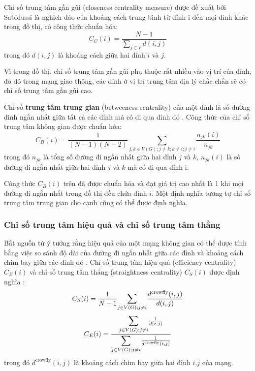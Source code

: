 \documentclass[14pt, oneside, a4paper, openany]{scrartcl}
\begin{document}
Chỉ số trung tâm gần gũi (closeness centrality measure) được đề xuất bởi Sabidussi \cite{centrali03} là nghịch đảo của khoảng cách trung bình từ đỉnh i đến mọi đỉnh khác trong đồ thị, có công thức chuẩn hóa:
\begin{equation}
C_C(i) = \frac{N-1}{\sum_{j \in V} d(i,j)}
\end{equation}
trong đó $d(i,j)$ là khoảng cách giữa hai đỉnh $i$ và $j$.

Vì trong đồ thị, chỉ số trung tâm gần gũi phụ thuộc rất nhiều vào vị trí của đỉnh, đo đó trong mạng giao thông, các đỉnh ở vị trí trung tâm địa lý chắc chắn sẽ có chỉ số trung tâm gần gũi cao.

Chỉ số \textbf{trung tâm trung gian}  (betweeness centrality) của một đỉnh là số đường đinh ngắn nhất giữa tất cả các đỉnh mà có đi qua đỉnh đó \cite{centrali02}. Công thức của chỉ số trung tâm không gian được chuẩn hóa:
\begin{equation}
	C_B(i) = \frac{1}{(N-1)(N-2)} \sum_{j,k \in V(G); j \neq k; k\neq i; j \neq i} \frac{n_{jk}(i)}{n_{jk}}
\end{equation}
trong đó $n_{jk}$ là tổng số đường đi ngắn nhất giữa hai đỉnh $j$ và $k$, $n_{jk}(i)$ là số đường đi ngắn nhất giữa hai đỉnh $j$ và $k$ mà có đi qua đỉnh i.

Công thức $C_B(i)$ trên đã được chuẩn hóa và đạt giá trị cao nhất là 1 khi mọi đường đi ngắn nhất trong đồ thị đều chứa đỉnh $i$. Một định nghĩa tương tự chỉ số trung tâm trung gian cho cạnh cũng có thể được định nghĩa.

\subsubsection{Chỉ số trung tâm hiệu quả và chỉ số trung tâm thẳng}
Bắt nguồn từ ý tưởng rằng hiệu quả của một mạng không gian có thể được tính bằng việc so sánh độ dài của đường đi ngắn nhất giữa các đỉnh và khoảng cách chim bay giữa các đỉnh đó \cite{efficiency01}. Chỉ số trung tâm hiệu quả (efficiency centrality) $C_E(i)$ và chỉ số trung tâm thẳng (straightness centrality) $C_S(i)$ được định nghĩa \cite{efficiency02}:
\begin{equation}
C_S(i) = \frac{1}{N-1} \mathlarger{\sum}_{j \in V(G); j \neq i} \frac{d^{\text{crowfly}}(i,j)}{d(i,j)}
\end{equation}
\begin{equation}
	C_E(i) = \frac{\mathlarger{\sum}_{j \in V(G); j \neq i}\frac{1}{d(i,j)}}{\mathlarger{\sum}_{j \in V(G); j \neq i}\frac{1}{d^{\text{crowfly}}(i,j)}}
\end{equation}
trong đó $d^{\text{crowfly}}(i,j)$ là khoảng cách chim bay giữa hai đỉnh $i$,$j$ của mạng.
\end{document}
